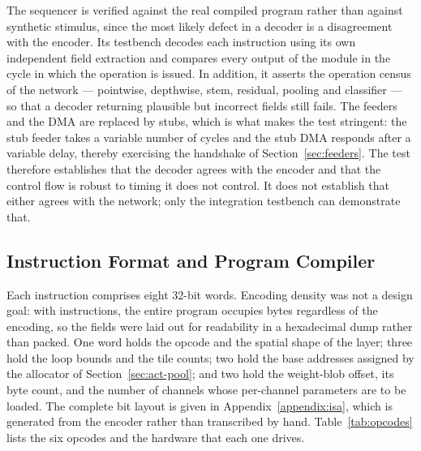 The sequencer is verified against the real compiled program rather than against
synthetic stimulus, since the most likely defect in a decoder is a disagreement
with the encoder. Its testbench decodes each instruction using its own
independent field extraction and compares every output of the module in the
cycle in which the operation is issued. In addition, it asserts the operation
census of the network --- \thOpsPw{} pointwise, \thOpsDw{} depthwise,
\thOpsStem{} stem, \thOpsRes{} residual, \thOpsGap{} pooling and \thOpsLin{}
classifier --- so that a decoder returning plausible but incorrect fields still
fails. The feeders and the DMA are replaced by stubs, which is what makes the
test stringent: the stub feeder takes a variable number of cycles and the stub
DMA responds after a variable delay, thereby exercising the handshake of
Section~\ref{sec:feeders}. The test therefore establishes that the decoder
agrees with the encoder and that the control flow is robust to timing it does
not control. It does not establish that either agrees with the network; only
the integration testbench can demonstrate that.

\subsection{Instruction Format and Program Compiler}
\label{sec:isa-format}

Each instruction comprises eight 32-bit words. Encoding density was not a design
goal: with \thInstructions{} instructions, the entire program occupies
\thProgBytes{} bytes regardless of the encoding, so the fields were laid out for
readability in a hexadecimal dump rather than packed. One word holds the opcode
and the spatial shape of the layer; three hold the loop bounds and the tile
counts; two hold the base addresses assigned by the allocator of
Section~\ref{sec:act-pool}; and two hold the weight-blob offset, its byte count,
and the number of channels whose per-channel parameters are to be loaded. The
complete bit layout is given in Appendix~\ref{appendix:isa}, which is generated
from the encoder rather than transcribed by hand. Table~\ref{tab:opcodes} lists
the six opcodes and the hardware that each one drives.

